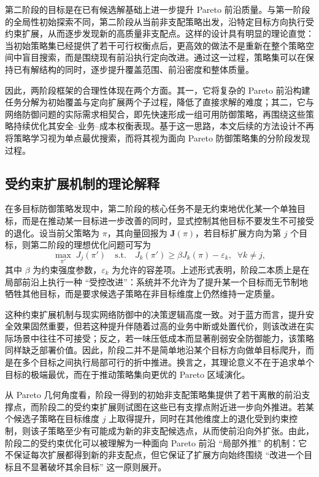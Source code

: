 \documentclass[12pt,a4paper]{article}
\begin{document}
第二阶段的目标是在已有候选解基础上进一步提升 Pareto 前沿质量。与第一阶段的全局性初始探索不同，第二阶段从当前非支配策略出发，沿特定目标方向执行受约束扩展，从而逐步发现新的高质量非支配点。这样的设计具有明显的理论直觉：当初始策略集已经提供了若干可行权衡点后，更高效的做法不是重新在整个策略空间中盲目搜索，而是围绕现有前沿执行定向改进。通过这一过程，策略集可以在保持已有解结构的同时，逐步提升覆盖范围、前沿密度和整体质量。

因此，两阶段框架的合理性体现在两个方面。其一，它将复杂的 Pareto 前沿构建任务分解为初始覆盖与定向扩展两个子过程，降低了直接求解的难度；其二，它与网络防御问题的实际需求相契合，即先快速形成一组可用防御策略，再围绕这些策略持续优化其安全--业务--成本权衡表现。基于这一思路，本文后续的方法设计不再将策略学习视为单点最优搜索，而将其视为面向 Pareto 防御策略集的分阶段发现过程。


\subsection{受约束扩展机制的理论解释}

在多目标防御策略发现中，第二阶段的核心任务不是无约束地优化某一个单独目标，而是在推动某一目标进一步改善的同时，显式控制其他目标不要发生不可接受的退化。设当前父策略为 $\pi$，其向量回报为 $\mathbf{J}(\pi)$，若目标扩展方向为第 $j$ 个目标，则第二阶段的理想优化问题可写为
\begin{equation}
\max_{\pi'} \; J_j(\pi')
\quad
\text{s.t.}
\quad
J_k(\pi') \ge \beta J_k(\pi) - \varepsilon_k,\;\; \forall k \neq j,
\end{equation}
其中 $\beta$ 为约束强度参数，$\varepsilon_k$ 为允许的容差项。上述形式表明，阶段二本质上是在局部前沿上执行一种 ``受控改进''：系统并不允许为了提升某一个目标而无节制地牺牲其他目标，而是要求候选子策略在非目标维度上仍然维持一定质量。

这种约束扩展机制与现实网络防御中的决策逻辑高度一致。对于蓝方而言，提升安全效果固然重要，但若这种提升伴随着过高的业务中断或处置代价，则该改进在实际场景中往往不可接受；反之，若一味压低成本而显著削弱安全防御能力，该策略同样缺乏部署价值。因此，阶段二并不是简单地沿某个目标方向做单目标爬升，而是在多个目标之间执行局部可行的折中推进。换言之，其理论意义不在于追求单个目标的极端最优，而在于推动策略集向更优的 Pareto 区域演化。

从 Pareto 几何角度看，阶段一得到的初始非支配策略集提供了若干离散的前沿支撑点，而阶段二的受约束扩展则试图在这些已有支撑点附近进一步向外推进。若某个候选子策略在目标维度 $j$ 上取得提升，同时在其他维度上的退化受到约束控制，则该子策略至少有可能成为新的非支配候选点，从而使前沿向外扩张。由此，阶段二的受约束优化可以被理解为一种面向 Pareto 前沿 ``局部外推'' 的机制：它不保证每次扩展都得到新的非支配点，但它保证了扩展方向始终围绕 ``改进一个目标且不显著破坏其余目标'' 这一原则展开。
\end{document}
